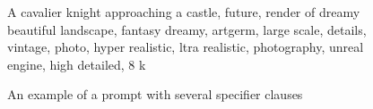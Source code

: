 \begin{figure}[h]
    \begin{center}
        A cavalier knight approaching a castle, future, render of dreamy beautiful landscape, fantasy dreamy, artgerm, large scale, details, vintage, photo, hyper realistic, ltra realistic, photography, unreal engine, high detailed, 8 k
    \end{center}
\caption{An example of a prompt with several specifier clauses \autocite{poloclub-diffusiondb}} %
\label{specifier_example}
\end{figure}


    